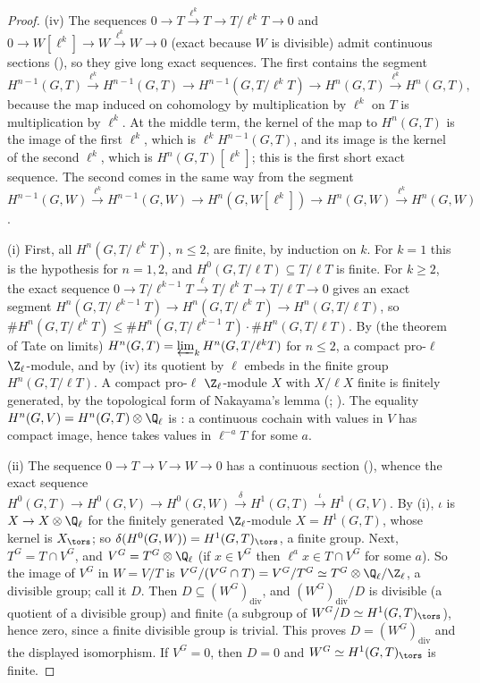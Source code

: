\begin{proof}
(iv) The sequences $0\to T\xrightarrow{\ell^k}T\to T/\ell^kT\to0$ and $0\to W[\ell^k]\to W\xrightarrow{\ell^k}W\to0$ (exact because $W$ is divisible) admit continuous sections
(), so they give long exact sequences. The first contains the segment
\[
H^{n-1}(G,T)\xrightarrow{\ \ell^k\ }H^{n-1}(G,T)\to H^{n-1}(G,T/\ell^kT)\to H^n(G,T)\xrightarrow{\ \ell^k\ }H^n(G,T),
\]
because the map induced on cohomology by multiplication by $\ell^k$ on $T$ is multiplication by $\ell^k$. At the middle term, the kernel of the map to $H^n(G,T)$ is the image of
the first $\ell^k$, which is $\ell^kH^{n-1}(G,T)$, and its image is the kernel of the second $\ell^k$, which is $H^n(G,T)[\ell^k]$; this is the first short exact sequence. The second
comes in the same way from the segment $H^{n-1}(G,W)\xrightarrow{\ell^k}H^{n-1}(G,W)\to H^n(G,W[\ell^k])\to H^n(G,W)\xrightarrow{\ell^k}H^n(G,W)$.

(i) First, all $H^n(G,T/\ell^kT)$, $n\le2$, are finite, by induction on $k$. For $k=1$ this is the hypothesis for $n=1,2$, and $H^0(G,T/\ell T)\subseteq T/\ell T$ is finite. For
$k\ge2$, the exact sequence $0\to T/\ell^{k-1}T\xrightarrow{\ \ell\ }T/\ell^kT\to T/\ell T\to0$ gives an exact segment
$H^n(G,T/\ell^{k-1}T)\to H^n(G,T/\ell^kT)\to H^n(G,T/\ell T)$, so $\#H^n(G,T/\ell^kT)\le\#H^n(G,T/\ell^{k-1}T)\cdot\#H^n(G,T/\ell T)$.
By  (the theorem of Tate on limits) $H^n(G,T)=\varprojlim_kH^n(G,T/\ell^kT)$ for $n\le2$, a compact pro-$\ell$ $\Z_\ell$-module, and by (iv) its
quotient by $\ell$ embeds in the finite group $H^n(G,T/\ell T)$. A compact pro-$\ell$ $\Z_\ell$-module $X$ with $X/\ell X$ finite is finitely generated, by the topological form of
Nakayama's lemma (; \cite[Appendix B]{Rubin}).
The equality $H^n(G,V)=H^n(G,T)\otimes\Q_\ell$ is : a continuous cochain with values in $V$ has compact image, hence takes values in $\ell^{-a}T$ for
some $a$.

(ii) The sequence $0\to T\to V\to W\to0$ has a continuous section (), whence the exact sequence
$H^0(G,T)\to H^0(G,V)\to H^0(G,W)\xrightarrow{\delta}H^1(G,T)\xrightarrow{\iota}H^1(G,V)$. By (i), $\iota$ is $X\to X\otimes\Q_\ell$ for the finitely generated $\Z_\ell$-module
$X=H^1(G,T)$, whose kernel is $X_{\tors}$; so $\delta(H^0(G,W))=H^1(G,T)_{\tors}$, a finite group. Next, $T^G=T\cap V^G$, and $V^G=T^G\otimes\Q_\ell$ (if $x\in V^G$
then $\ell^ax\in T\cap V^G$ for some $a$). So the image of $V^G$ in $W=V/T$ is $V^G/(V^G\cap T)=V^G/T^G\simeq T^G\otimes\Q_\ell/\Z_\ell$, a divisible group; call it $D$.
Then $D\subseteq(W^G)_{\mathrm{div}}$, and $(W^G)_{\mathrm{div}}/D$ is divisible (a quotient of a divisible group) and finite (a subgroup of $W^G/D\simeq H^1(G,T)_{\tors}$),
hence zero, since a finite divisible group is trivial. This proves $D=(W^G)_{\mathrm{div}}$ and the displayed isomorphism. If $V^G=0$, then $D=0$ and $W^G\simeq H^1(G,T)_{\tors}$
is finite.


\end{proof}
